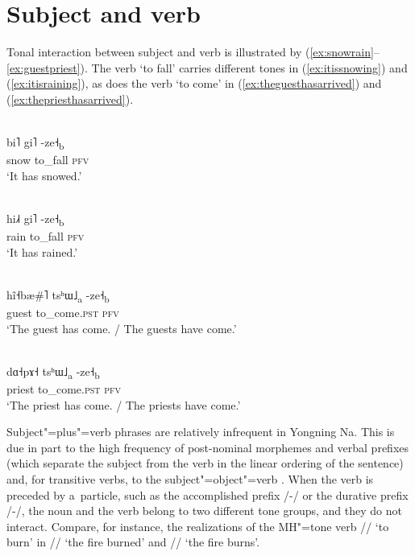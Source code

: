 \section{Subject and verb}
\label{sec:subjectandverb}

Tonal interaction between subject and verb is illustrated by
(\ref{ex:snowrain}--\ref{ex:guestpriest}). The verb ‘to fall’ carries different tones in (\ref{ex:itissnowing}) and (\ref{ex:itisraining}), as does the verb ‘to come’ in (\ref{ex:theguesthasarrived}) and (\ref{ex:thepriesthasarrived}).

\begin{exe}
  \ex
  \label{ex:snowrain}
  \begin{xlist}
    \ex
  \label{ex:itissnowing}
  \\
  \gll bi˥	gi˥	-ze˧\textsubscript{b}\\
  snow	to\_fall	\textsc{pfv}\\
  \glt 		‘It has snowed.’

  \ex
  \label{ex:itisraining}
  \\
  \gll hi˩˧	gi˥	-ze˧\textsubscript{b}\\
  rain	to\_fall	\textsc{pfv}\\
  \glt 		‘It has rained.’
  \end{xlist}

  \ex
  \label{ex:guestpriest}
  \begin{xlist}
  \ex
  \label{ex:theguesthasarrived}
  \\
  \gll hĩ˧bæ\#˥	tsʰɯ˩\textsubscript{a}	-ze˧\textsubscript{b}\\
  guest		to\_come.\textsc{pst}		\textsc{pfv}\\
  \glt 		‘The guest has come. / The guests have come.’

  \ex
  \label{ex:thepriesthasarrived}
  \\
  \gll dɑ˧pɤ˧		tsʰɯ˩\textsubscript{a}	-ze˧\textsubscript{b}\\
  priest		to\_come.\textsc{pst}	\textsc{pfv}\\
  \glt 		‘The priest has come. / The priests have come.’
  \end{xlist}
\end{exe}


Subject"=plus"=verb phrases are relatively infrequent in Yongning Na. This is due in part to the high
frequency of post-nominal morphemes and verbal prefixes (which separate the subject from the verb in the linear ordering of the sentence) and, for transitive verbs, to the subject"=object"=verb . When the verb is preceded by a~particle, such as the {accomplished} prefix
/-/ or the {durative} prefix /-/, the noun and the verb belong to two different tone
groups, and they do not interact. Compare, for instance, the realizations of the MH"=tone verb
// ‘to burn’ in // ‘the fire burned’ and // ‘the fire
burns’.

